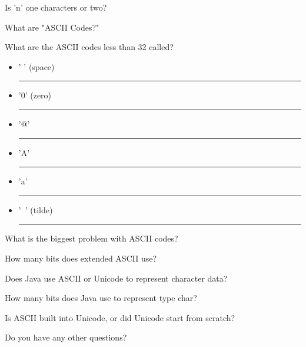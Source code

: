 \documentclass[letterpaper,12pt]{exam}
\begin{document}
\begin{questions}
\begin{samepage}
	\question Is 'n' one characters or two?
	\vspace{5mm}
\end{samepage}

\begin{samepage}
	\question What are "ASCII Codes?"
	\vspace{5mm}
\end{samepage}
\begin{samepage}
	\question What are the ASCII codes less than 32 called?
	\vspace{5mm}
\end{samepage}
\begin{samepage}
	\question 
	  \begin{itemize}
		\item ' ' (space) \rule{20mm}{0.15mm}
		\vspace{5mm}
		\item '0' (zero) \rule{20mm}{0.15mm}
		\vspace{5mm}
		\item '@' \rule{20mm}{0.15mm}
		\vspace{5mm}
		\item 'A' \rule{20mm}{0.15mm} 
		\vspace{5mm}
		\item 'a' \rule{20mm}{0.15mm}
		\vspace{5mm}
		\item '~' (tilde) \rule{20mm}{0.15mm}
		\vspace{5mm}
	   \end{itemize}
\end{samepage}
\begin{samepage}
	\question What is the biggest problem with ASCII codes?
	\vspace{15mm}
\end{samepage}
\begin{samepage}
	\question How many bits does extended ASCII use?
	\vspace{5mm}
\end{samepage}


\begin{samepage}
	\question Does Java use ASCII or Unicode to represent character data?
	\vspace{5mm}
\end{samepage}

\begin{samepage}
	\question How many bits does Java use to represent type char?
	\vspace{5mm}
\end{samepage}

\begin{samepage}
	\question Is ASCII built into Unicode, or did Unicode start from scratch?
	\vspace{5mm}
\end{samepage}


\begin{samepage}
	\question Do you have any other questions?
	\vspace{30mm}
\end{samepage}

\end{questions}
\end{document}

